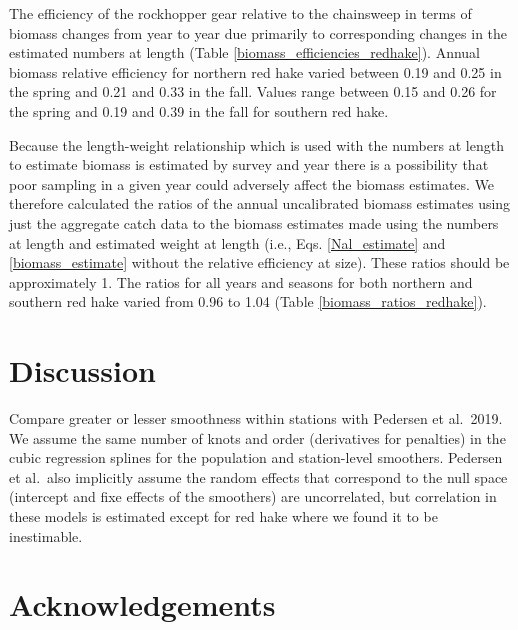 \documentclass[]{article}
\begin{document}
The efficiency of the rockhopper gear relative to the chainsweep in
terms of biomass changes from year to year due primarily to
corresponding changes in the estimated numbers at length (Table
\ref{biomass_efficiencies_redhake}). Annual biomass relative efficiency
for northern red hake varied between 0.19 and 0.25 in the spring and
0.21 and 0.33 in the fall. Values range between 0.15 and 0.26 for the
spring and 0.19 and 0.39 in the fall for southern red hake.

Because the length-weight relationship which is used with the numbers at
length to estimate biomass is estimated by survey and year there is a
possibility that poor sampling in a given year could adversely affect
the biomass estimates. We therefore calculated the ratios of the annual
uncalibrated biomass estimates using just the aggregate catch data to
the biomass estimates made using the numbers at length and estimated
weight at length (i.e., Eqs. \ref{Nal_estimate} and
\ref{biomass_estimate} without the relative efficiency at size). These
ratios should be approximately 1. The ratios for all years and seasons
for both northern and southern red hake varied from 0.96 to 1.04 (Table
\ref{biomass_ratios_redhake}).

\hypertarget{discussion}{%
\section{Discussion}\label{discussion}}

Compare greater or lesser smoothness within stations with Pedersen et
al.~2019. We assume the same number of knots and order (derivatives for
penalties) in the cubic regression splines for the population and
station-level smoothers. Pedersen et al.~also implicitly assume the
random effects that correspond to the null space (intercept and fixe
effects of the smoothers) are uncorrelated, but correlation in these
models is estimated except for red hake where we found it to be
inestimable.

\hypertarget{acknowledgements}{%
\section*{Acknowledgements}\label{acknowledgements}}

\pagebreak



\hypertarget{refs}{}

\pagebreak
\end{document}
